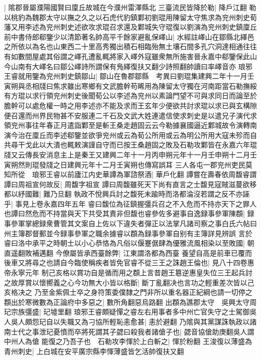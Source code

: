 |{
	隂郡晉屬濮陽國賢曰廩丘故城在今濮州雷澤縣北}
三臺流民皆降於勒|{
	降戶江翻}
勒以桃豹為魏郡太守以撫之久之以石虎代豹鎮鄴初劉琨用陳留太守焦求為兖州刺史荀藩又用李述為兖州刺史述欲攻求琨召求還及鄴城失守琨復以劉演為兖州刺史鎮廩丘前中書侍郎郗鑒少以清節著名帥高平千餘家避亂保嶧山|{
	水經註嶧山在鄒縣北繹邑之所依以為名也山東西二十里高秀獨出積石相臨殆無土壤石間多孔穴洞達相通往往有如數間屋處其俗謂之嶧孔遭亂輒將家入嶧外寇雖衆無所施害晉永嘉中郗鑒保此山今山南有大嶧名曰鄒公嶧詩所謂保有鳬繹復扶又翻少詩照翻帥讀曰率嶧音亦}
琅邪王睿就用鑒為兖州刺史鎮鄒山|{
	鄒山在魯郡鄒縣　考異曰劉琨集建興二年十一月壬寅朔與丞相牋曰焦求雖出寒鄉有文武膽幹苟晞用為陳留太守獨在河南距當石勒撫綏有方琨以求行領兖州刺史後聞荀公以李述為兖州以素論門望不可與求同日而論至於膽幹可以處危權一時之用李述亦不能及求而王玄年少便欲共討求琨以求已與玄構隙便召還而州界民物甚不安服連二千石及文武大姓連遣信使求刺史是以遣兄子演代求領兖州事往年春正月遣詣鄴至是斬王桑走趙固云云今勒據襄國逼近鄴城故令演轉南演今治在廩丘而李述郗鑒並欲爭兖州或云為荀公所用或云為明公所用大寇未殄而自共尋干戈此以大潰也輒敕演謹自守而已按王桑趙固之敗及石勒攻鄴皆在永嘉六年琨牋又云傳長安消息主上是秦王又建興二年十一月丙申朔元年十一月壬申朔十二月壬寅朔然則琨發牋之日建興元年十二月壬寅朔也傳寫誤耳}
三人各屯一郡兖州吏民莫知所從　琅邪王睿以前廬江内史華譚為軍諮祭酒|{
	華戶化翻}
譚嘗在壽春依周馥睿謂譚曰周祖宣何故反|{
	周馥字祖宣}
譚曰周馥雖死天下尚有直言之士馥見寇賊滋蔓欲移都以紓國難|{
	難乃旦翻}
執政不悅興兵討之馥死未踰時而洛都淪沒若謂之反不亦誣乎|{
	事見上卷永嘉四年五年}
睿曰馥位為征鎮握彊兵召之不入危而不持亦天下之罪人也譚曰然危而不持當與天下共受其責非但馥也睿參佐多避事自逸録事參軍陳頵|{
	録事參軍掌總録衆曹管其文案自上佐以下違失者彈正以法掌凡諸司察之事白氏六帖曰州主簿郡督郵並今録事參軍之職余據睿以頵為録事參軍自别有主簿詳見辨誤}
言於睿曰洛中承平之時朝士以小心恭恪為凡俗以偃蹇倨肆為優雅流風相染以至敗國|{
	朝直遥翻敗補邁翻}
今僚屬皆承西臺餘弊|{
	江東謂洛都為西臺}
養望自高是前車已覆而後車又將尋之也請自今臨使稱疾者皆免官睿不從三王之誅趙王倫也|{
	見八十四卷惠帝永寧元年}
制己亥格以賞功自是循而用之頵上言昔趙王簒逆惠皇失位三王起兵討之故厚賞以懷嚮義之心今功無大小皆以格斷|{
	斷丁亂翻决也言功之輕重差次皆以己亥格决之}
乃至金紫佩士卒之身符策委僕隸之門非所以重名器正紀綱也請一切停之頵出於寒微數為正論府中多惡之|{
	數所角翻惡烏路翻}
出頵為譙郡太守　吳興太守周玘宗族彊盛|{
	玘墟里翻}
琅邪王睿頗疑憚之睿左右用事者多中州亡官失守之士駕御吳人吳人頗怨玘自以失職又為刁協所輕恥恚愈甚|{
	恚於避翻}
乃隂與其黨謀誅執政以諸南士代之事泄玘憂憤而卒將死謂其子勰曰殺我者諸傖子也|{
	勰音協傖助庚翻吳人謂中州人為傖}
能復之乃吾子也　石勒攻李惲於上白斬之|{
	惲於粉翻}
王浚復以薄盛為青州刺史|{
	上白城在安平廣宗縣李惲薄盛皆乞活帥復扶又翻}
